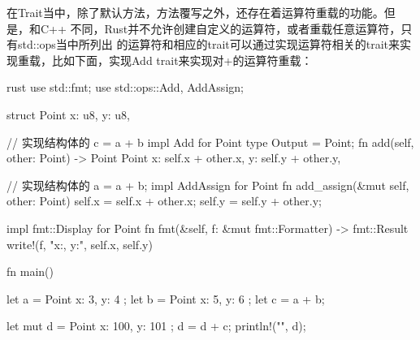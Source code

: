 在Trait当中，除了默认方法，方法覆写之外，还存在着运算符重载的功能。但是，和C++
不同，Rust并不允许创建自定义的运算符，或者重载任意运算符，只有std::ops当中所列出
的运算符和相应的trait可以通过实现运算符相关的trait来实现重载，比如下面，实现Add
trait来实现对+的运算符重载：
\begin{code-block}{rust}
use std::fmt;
use std::ops::{Add, AddAssign};

struct Point {
    x: u8,
    y: u8,
}

// 实现结构体的 c = a + b
impl Add for Point {
    type Output = Point;
    fn add(self, other: Point) -> Point {
        Point {
            x: self.x + other.x,
            y: self.y + other.y,
        }
    }
}

// 实现结构体的 a = a + b;
impl AddAssign for Point {
    fn add_assign(&mut self, other: Point) {
        self.x = self.x + other.x;
        self.y = self.y + other.y;
    }
}

impl fmt::Display for Point {
    fn fmt(&self, f: &mut fmt::Formatter) -> fmt::Result {
        write!(f, "x:{}, y:{}", self.x, self.y)
    }
}

fn main() {
    let a = Point { x: 3, y: 4 };
    let b = Point { x: 5, y: 6 };
    let c = a + b;

    let mut d = Point { x: 100, y: 101 };
    d = d + c;
    println!("{}", d);
}
\end{code-block}

